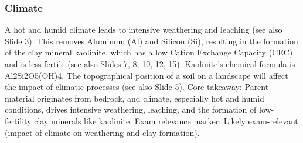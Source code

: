 \subsubsection{Climate} A hot and humid climate leads to intensive weathering and leaching (see also Slide 3). This removes Aluminum (Al) and Silicon (Si), resulting in the formation of the clay mineral kaolinite, which has a low Cation Exchange Capacity (CEC) and is less fertile (see also Slides 7, 8, 10, 12, 15). Kaolinite's chemical formula is Al2Si2O5(OH)4. The topographical position of a soil on a landscape will affect the impact of climatic processes (see also Slide 5).
Core takeaway: Parent material originates from bedrock, and climate, especially hot and humid conditions, drives intensive weathering, leaching, and the formation of low-fertility clay minerals like kaolinite. Exam relevance marker: Likely exam-relevant (impact of climate on weathering and clay formation).
